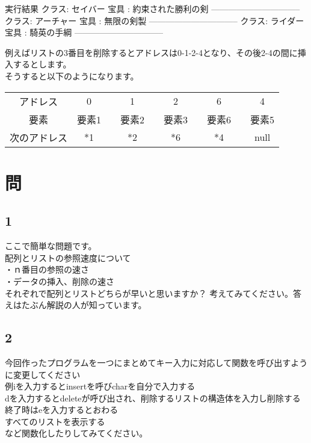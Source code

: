 
\begin{itembox}{実行結果}
クラス: セイバー
宝具 : 約束された勝利の剣
--------------------------------
クラス: アーチャー
宝具 : 無限の剣製
--------------------------------
クラス: ライダー
宝具 : 騎英の手綱
--------------------------------
\end{itembox}
例えばリストの3番目を削除するとアドレスは0-1-2-4となり、その後2-4の間に挿入するとします。\\
そうすると以下のようになります。
\begin{table}[htb]
\begin{center}
\begin{tabular}{|c|c|c|c|c|c|c|c|c|c|}
\cline{1-1}\cline{2-2}\cline{4-4}\cline{6-6}\cline{8-8}\cline{10-10}
アドレス & 0 && 1 && 2 && 6 && 4 \\ \cline{1-1}\cline{2-2}\cline{4-4}\cline{6-6}\cline{8-8}\cline{10-10}
要素 & 要素1 && 要素2 && 要素3 && 要素6 && 要素5\\ \cline{1-1}\cline{2-2}\cline{4-4}\cline{6-6}\cline{8-8}\cline{10-10}
次のアドレス & *1 && *2 && *6 && *4 && null   \\ 
\cline{1-1}\cline{2-2}\cline{4-4}\cline{6-6}\cline{8-8}\cline{10-10}
\end{tabular}
\end{center}
\end{table}

\section{問}
\subsection{1}
ここで簡単な問題です。\\
配列とリストの参照速度について\\
・ｎ番目の参照の速さ\\
・データの挿入、削除の速さ\\
それぞれで配列とリストどちらが早いと思いますか？
考えてみてください。答えはたぶん解説の人が知っています。

\subsection{2}
今回作ったプログラムを一つにまとめてキー入力に対応して関数を呼び出すように変更してください\\
例iを入力するとinsertを呼びcharを自分で入力する\\
dを入力するとdeleteが呼び出され、削除するリストの構造体を入力し削除する\\
終了時はeを入力するとおわる\\
すべてのリストを表示する\\
など関数化したりしてみてください。

